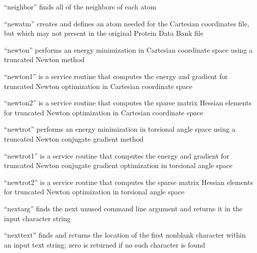 \documentclass[letterpaper,11pt,english]{sphinxmanual}
\begin{document}


“neighbor” finds all of the neighbors of each atom


“newatm” creates and defines an atom needed for the Cartesian coordinates file, but which may not present in the original Protein Data Bank file


“newton” performs an energy minimization in Cartesian coordinate space using a truncated Newton method


“newton1” is a service routine that computes the energy and gradient for truncated Newton optimization in Cartesian coordinate space


“newton2” is a service routine that computes the sparse matrix Hessian elements for truncated Newton optimization in Cartesian coordinate space


“newtrot” performs an energy minimization in torsional angle space using a truncated Newton conjugate gradient method


“newtrot1” is a service routine that computes the energy and gradient for truncated Newton conjugate gradient optimization in torsional angle space


“newtrot2” is a service routine that computes the sparse matrix Hessian elements for truncated Newton optimization in torsional angle space


“nextarg” finds the next unused command line argument and returns it in the input character string


“nexttext” finds and returns the location of the first non\sphinxhyphen{}blank character within an input text string; zero is returned if no such character is found

\end{document}
